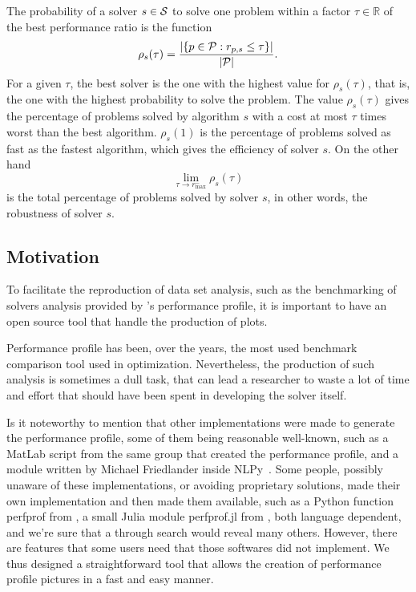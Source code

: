     The probability of a solver $s \in \mathcal{S}$  to solve one problem within a
    factor $\tau \in \mathds{R}$ of the best performance ratio is the function
    \begin{align*}
      \rho_s(\tau) = \frac{| \{p \in \mathcal{P}: r_{p,s} \leq \tau\} |}{| \mathcal{P} |}.
    \end{align*}
    For a given $\tau$, the best solver is the one with the highest value for
    $\rho_s(\tau)$, that is, the one with the highest probability to solve the
    problem.
    The value $\rho_s(\tau)$ gives the percentage of problems solved by
    algorithm $s$ with a cost at most $\tau$ times worst than the best
    algorithm. $\rho_s(1)$ is the percentage of problems solved as fast as the
    fastest algorithm, which gives the efficiency of solver $s$.
    On the other hand
    \[\displaystyle \lim_{\tau\rightarrow r^-_{\max}} \rho_s(\tau)\]
    is the total percentage of problems solved by solver $s$, in
    other words, the robustness of solver $s$.

\subsection*{Motivation}

    To facilitate the reproduction of data set analysis, such as the
    benchmarking of solvers analysis provided by \textcite{Dolan:2002du}'s
    performance profile, it is important to have an open source tool that handle
    the production of plots.

    Performance profile has been, over the years, the most used benchmark
    comparison tool used in optimization. Nevertheless, the production of such
    analysis is sometimes a dull task, that can lead a researcher to waste a lot
    of time and effort that should have been spent in developing the solver
    itself.

    Is it noteworthy to mention that other
    implementations were made to generate the performance profile,
    some of them being reasonable well-known, such as a MatLab
    script\cite{url:cops} from
    the same group that created the performance profile,
    and a module written by
    Michael Friedlander inside
    NLPy~\cite{url:NLPy}.
    Some people, possibly unaware of these implementations, or avoiding
    proprietary solutions, made their own implementation and then made them
    available, such as a Python function perfprof from \textcite{url:perfprof},
    a small Julia module perfprof.jl from \textcite{url:perfprofjl}, both
    language dependent, and we're sure that a through search would reveal many
    others.
    However, there are features that some users need that those softwares did
    not implement.
    We thus designed a straightforward tool that allows the creation of
    performance profile pictures in a fast and easy manner.

